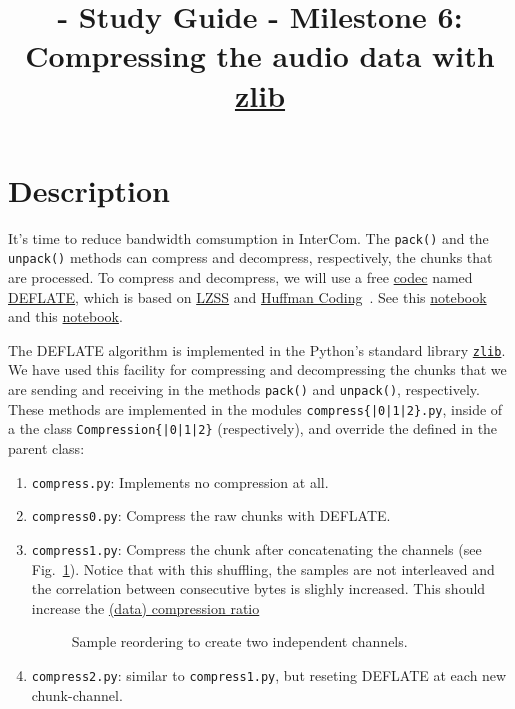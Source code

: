 
\title{\TM{} - Study Guide - Milestone 6: Compressing the audio data with \href{https://zlib.net/}{zlib}}

\maketitle

\section{Description}

It's time to reduce bandwidth comsumption in InterCom. The
\verb|pack()| and the \verb|unpack()| methods can compress and
decompress, respectively, the chunks that are processed. To compress
and decompress, we will use a free
\href{https://en.wikipedia.org/wiki/Codec}{codec} named
\href{https://en.wikipedia.org/wiki/DEFLATE}{DEFLATE}, which is based
on
\href{https://en.wikipedia.org/wiki/Lempel%E2%80%93Ziv%E2%80%93Storer%E2%80%93Szymanski}{LZSS}
  and \href{https://en.wikipedia.org/wiki/Huffman_coding}{Huffman
    Coding}~\cite{nelson96datacompression}. See this
  \href{https://github.com/vicente-gonzalez-ruiz/LZ77}{notebook} and
  this
  \href{https://vicente-gonzalez-ruiz.github.io/Huffman_coding/}{notebook}.

The DEFLATE algorithm is implemented in the Python's standard library
\href{https://docs.python.org/3/library/zlib.html}{\texttt{zlib}}. We
have used this facility for compressing and decompressing the chunks
that we are sending and receiving in the methods \verb|pack()| and
\verb|unpack()|, respectively. These methods are implemented in the
modules \texttt{compress\{|0|1|2\}.py}, inside of a the class
\texttt{Compression\{|0|1|2\}} (respectively), and
override the defined in the parent class:

\begin{enumerate}
\item \verb|compress.py|: Implements no compression at all.
\item \verb|compress0.py|: Compress the raw chunks with DEFLATE.
\item \verb|compress1.py|: Compress the chunk after concatenating the
  channels (see Fig.~\ref{fig:reordering}). Notice that with this
  shuffling, the samples are not interleaved and the correlation
  between consecutive bytes is slighly increased. This should increase
  the
  \href{https://en.wikipedia.org/wiki/Data_compression_ratio}{(data)
    compression ratio}
\begin{figure}
  \begin{center}
  \end{center}
  \caption{Sample reordering to create two independent channels.}
  \label{fig:reordering}
\end{figure}
\item \verb|compress2.py|: similar to \verb|compress1.py|, but
  reseting DEFLATE at each new chunk-channel.
\end{enumerate}

